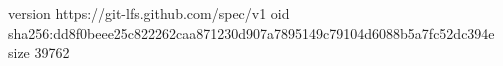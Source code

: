 version https://git-lfs.github.com/spec/v1
oid sha256:dd8f0beee25c822262caa871230d907a7895149c79104d6088b5a7fc52dc394e
size 39762
